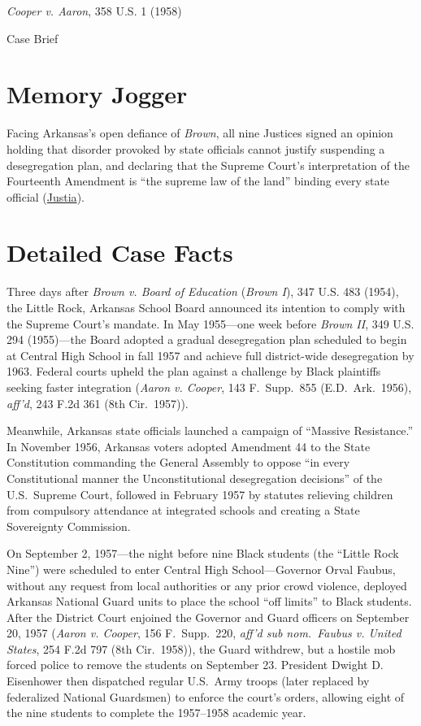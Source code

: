 \documentclass[12pt]{article}
\begin{document}
\begin{center}
{\LARGE \textit{Cooper v. Aaron}, 358 U.S. 1 (1958)\par}
\vspace{0.8em}
{\large Case Brief\par}
\end{center}
\vspace{1em}

\section{Memory Jogger}
Facing Arkansas's open defiance of \textit{Brown}, all nine Justices signed an opinion holding that disorder provoked by state officials cannot justify suspending a desegregation plan, and declaring that the Supreme Court's interpretation of the Fourteenth Amendment is ``the supreme law of the land'' binding every state official (\href{https://supreme.justia.com/cases/federal/us/358/1/}{Justia}).

\section{Detailed Case Facts}
Three days after \textit{Brown v. Board of Education} (\textit{Brown I}), 347 U.S. 483 (1954), the Little Rock, Arkansas School Board announced its intention to comply with the Supreme Court's mandate. In May 1955---one week before \textit{Brown II}, 349 U.S. 294 (1955)---the Board adopted a gradual desegregation plan scheduled to begin at Central High School in fall 1957 and achieve full district-wide desegregation by 1963. Federal courts upheld the plan against a challenge by Black plaintiffs seeking faster integration (\textit{Aaron v. Cooper}, 143 F.\ Supp.\ 855 (E.D.\ Ark.\ 1956), \textit{aff'd}, 243 F.2d 361 (8th Cir.\ 1957)).

Meanwhile, Arkansas state officials launched a campaign of ``Massive Resistance.'' In November 1956, Arkansas voters adopted Amendment 44 to the State Constitution commanding the General Assembly to oppose ``in every Constitutional manner the Unconstitutional desegregation decisions'' of the U.S.\ Supreme Court, followed in February 1957 by statutes relieving children from compulsory attendance at integrated schools and creating a State Sovereignty Commission.

On September 2, 1957---the night before nine Black students (the ``Little Rock Nine'') were scheduled to enter Central High School---Governor Orval Faubus, without any request from local authorities or any prior crowd violence, deployed Arkansas National Guard units to place the school ``off limits'' to Black students. After the District Court enjoined the Governor and Guard officers on September 20, 1957 (\textit{Aaron v. Cooper}, 156 F.\ Supp.\ 220, \textit{aff'd sub nom.\ Faubus v. United States}, 254 F.2d 797 (8th Cir.\ 1958)), the Guard withdrew, but a hostile mob forced police to remove the students on September 23. President Dwight D. Eisenhower then dispatched regular U.S.\ Army troops (later replaced by federalized National Guardsmen) to enforce the court's orders, allowing eight of the nine students to complete the 1957--1958 academic year.
\end{document}
